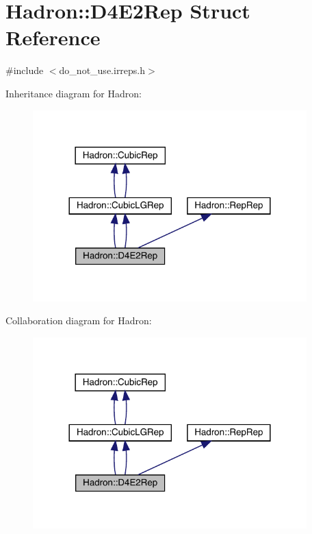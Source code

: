 \hypertarget{structHadron_1_1D4E2Rep}{}\section{Hadron\+:\+:D4\+E2\+Rep Struct Reference}
\label{structHadron_1_1D4E2Rep}


{\ttfamily \#include $<$do\+\_\+not\+\_\+use.\+irreps.\+h$>$}



Inheritance diagram for Hadron\+:\nopagebreak
\begin{figure}[H]
\begin{center}
\leavevmode
\includegraphics[width=300pt]{de/dfb/structHadron_1_1D4E2Rep__inherit__graph}
\end{center}
\end{figure}


Collaboration diagram for Hadron\+:\nopagebreak
\begin{figure}[H]
\begin{center}
\leavevmode
\includegraphics[width=300pt]{d0/db0/structHadron_1_1D4E2Rep__coll__graph}
\end{center}
\end{figure}
